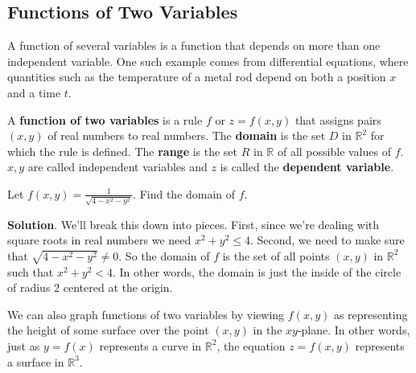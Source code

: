 \documentclass[10pt,]{book}
\newcommand{\terminology}[1]{\textbf{#1}}
\theoremstyle{ptxplainnotitle}
\theoremstyle{ptxplaintitle}
\theoremstyle{ptxplainnotitle}
\theoremstyle{ptxplaintitle}
\theoremstyle{ptxplainnotitle}
\theoremstyle{ptxplaintitle}
\theoremstyle{ptxdefinitionnotitle}
\theoremstyle{ptxdefinitiontitle}
\theoremstyle{ptxdefinitionnotitle}
\theoremstyle{ptxdefinitiontitle}
\theoremstyle{ptxdefinitionnotitle}
\theoremstyle{ptxdefinitiontitle}
\theoremstyle{ptxdefinitionnotitle}
\theoremstyle{ptxdefinitiontitle}
\theoremstyle{ptxdefinitionnotitle}
\theoremstyle{ptxdefinitiontitle}
\numberwithin{equation}{section}
\newcommand{\RR}{\mathbb{R}}
\begin{document}
\subsection[{Functions of Two Variables}]{Functions of Two Variables}\label{subsection-functions-of-two-variables}
\hypertarget{p-985}{}%
A function of several variables is a function that depends on more than one independent variable. One such example comes from differential equations, where quantities such as the temperature of a metal rod depend on both a position \(x\) and a time \(t\).%
\begin{definition}\label{definition-functions-of-two-variables}
\hypertarget{p-986}{}%
A \terminology{function of two variables} is a rule \(f\) or \(z = f(x,y)\) that assigns pairs \((x,y)\) of real numbers to real numbers. The \terminology{domain} is the set \(D\) in \(\RR^{2}\) for which the rule is defined. The \terminology{range} is the set \(R\) in \(\RR\) of all possible values of \(f\). \(x,y\) are called independent variables and \(z\) is called the \terminology{dependent variable}.%
\end{definition}
\begin{example}\label{example-domain-of-a-function}
\hypertarget{p-987}{}%
Let \(f(x,y) = \frac{1}{\sqrt{4 - x^{2} - y^{2}}}\). Find the domain of \(f\).%
\par\smallskip%
\noindent\textbf{Solution}.\hypertarget{solution-149}{}\quad%
\hypertarget{p-988}{}%
We'll break this down into pieces. First, since we're dealing with square roots in real numbers we need \(x^{2}+y^{2}\leq4\). Second, we need to make sure that \(\sqrt{4 - x^{2} - y^{2}}\neq0\). So the domain of \(f\) is the set of all points \((x,y)\) in \(\RR^{2}\) such that \(x^{2} + y^{2} < 4\). In other words, the domain is just the inside of the circle of radius \(2\) centered at the origin.%
\end{example}
\hypertarget{p-989}{}%
We can also graph functions of two variables by viewing \(f(x,y)\) as representing the height of some surface over the point \((x,y)\) in the \(xy\)-plane. In other words, just as \(y = f(x)\) represents a curve in \(\RR^{2}\), the equation \(z = f(x,y)\) represents a surface in \(\RR^{3}\).%
\end{document}
